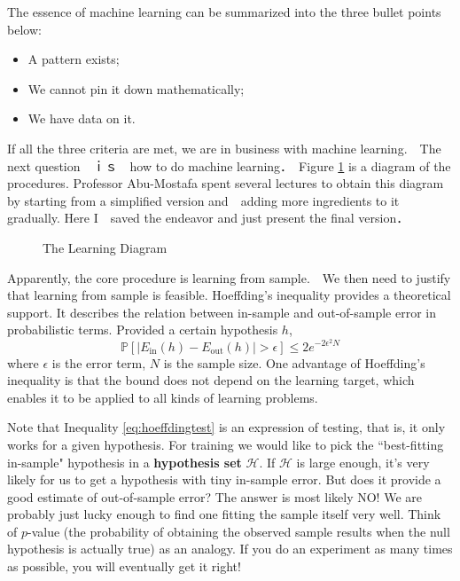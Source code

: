 \documentclass[10pt]{article}
\numberwithin{equation}{section}  %
\begin{document}
The essence of machine learning can be summarized into the three bullet points below:
\begin{itemize}
    \item A pattern exists;
    \item We cannot pin it down mathematically;
    \item We have data on it.
\end{itemize}
If all the three criteria are met, we are in business with machine learning.　The next question　ｉｓ　how to do machine learning．　Figure \ref{fig:learndiag} is a diagram of the procedures. Professor Abu-Mostafa spent several lectures to obtain this diagram by starting from a simplified version and　adding more ingredients to it gradually. Here I　saved the endeavor and just present the final version．
\begin{figure}
    \caption{The Learning Diagram}\label{fig:learndiag}
\end{figure}

Apparently, the core procedure is learning from sample.　We then need to justify that learning from sample is feasible. Hoeffding's inequality provides a theoretical support. It describes the relation between in-sample and out-of-sample error in probabilistic terms. Provided a certain hypothesis $h$,
\begin{equation}\label{eq:hoeffdingtest}
    \mathbb{P}[\vert E_\mathrm{in}(h)-E_\mathrm{out}(h)\vert > \epsilon] \leq 2e^{-2\epsilon^2N}
\end{equation}
where $\epsilon$ is the error term, $N$ is the sample size. One advantage of Hoeffding's inequality is that the bound does not depend on the learning target, which enables it to be applied to all kinds of learning problems.

Note that Inequality \eqref{eq:hoeffdingtest} is an expression of testing, that is, it only works for a given hypothesis. For training we would like to pick the ``best-fitting in-sample" hypothesis in a \textbf{hypothesis set} $\mathcal{H}$. If $\mathcal{H}$ is large enough, it's very likely for us to get a hypothesis with tiny in-sample error. But does it provide a good estimate of out-of-sample error? The answer is most likely NO! We are probably just lucky enough to find one fitting the sample itself very well. Think of $p$-value (the probability of obtaining the observed sample results when the null hypothesis is actually true) as an analogy. If you do an experiment as many times as possible, you will eventually get it right!
\end{document}

